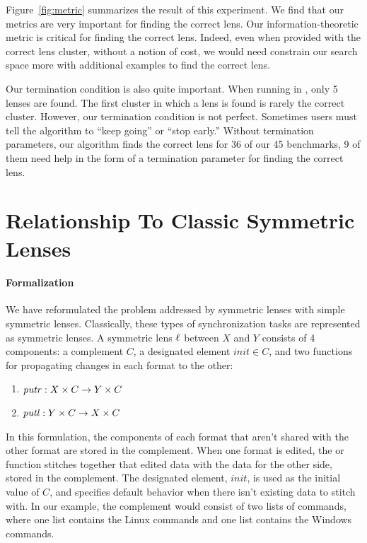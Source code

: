 \documentclass[acmsmall,screen,anonymous]{acmart}
\begin{document}
Figure~\ref{fig:metric} summarizes the result of this experiment. We find that
our metrics are very important for finding the correct lens. Our
information-theoretic metric is critical for finding the correct lens. Indeed,
even when provided with the correct lens cluster, without a notion of cost, we
would need constrain our search space more with additional examples to find the
correct lens.

Our termination condition is also quite important. When running in \FCOpt{},
only 5 lenses are found. The first cluster in which a lens is found is rarely
the correct cluster. However, our termination condition is not perfect.
Sometimes users must tell the algorithm to ``keep going'' or ``stop early.''
Without termination parameters, our algorithm finds the correct lens for 36 of
our 45 benchmarks, 9 of them need help in the form of a termination parameter
for finding the correct lens.

\section{Relationship To Classic Symmetric Lenses}
\label{sec:relationship}
\paragraph*{Formalization} We have reformulated the problem addressed by
symmetric lenses with simple symmetric lenses. Classically, these types of
synchronization tasks are represented as symmetric lenses. A symmetric lens
$\mathit{\ell}$ between $X$ and $Y$ consists of 4 components: a complement $C$, a
designated element $init \in C$, and two functions for propagating changes in
each format to the other:
\begin{enumerate}
\item $\mathit{putr} : X \times C \rightarrow Y \times C$
\item $\mathit{putl} : Y \times C \rightarrow X \times C$
\end{enumerate}
In this formulation, the components of each format that aren't shared with the
other format are stored in the complement. When one format is edited, the \PutR
or \PutL function stitches together that edited data with the data for the other
side, stored in the complement.  The designated element, $init$, is used as the
initial value of $C$, and specifies default behavior when there isn't existing
data to stitch with.  In our example, the complement
would consist of two lists 
of commands, where one list contains the Linux commands and one list contains
the Windows commands.
\end{document}
